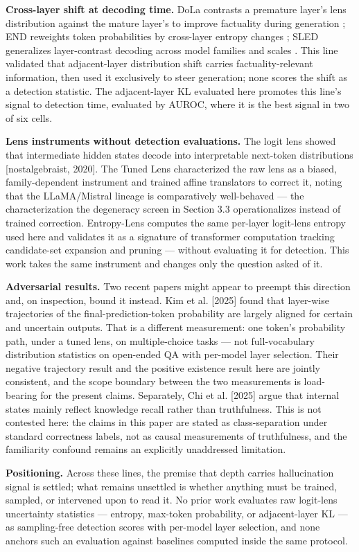 \textbf{Cross-layer shift at decoding time.} DoLa contrasts a premature layer's lens distribution against the mature layer's to improve factuality during generation \citep{Chuang2023}; END reweights token probabilities by cross-layer entropy changes \citep{Wu2025}; SLED generalizes layer-contrast decoding across model families and scales \citep{Zhang2024}. This line validated that adjacent-layer distribution shift carries factuality-relevant information, then used it exclusively to steer generation; none scores the shift as a detection statistic. The adjacent-layer KL evaluated here promotes this line's signal to detection time, evaluated by AUROC, where it is the best signal in two of six cells.

\textbf{Lens instruments without detection evaluations.} The logit lens showed that intermediate hidden states decode into interpretable next-token distributions [nostalgebraist, 2020]. The Tuned Lens characterized the raw lens as a biased, family-dependent instrument and trained affine translators to correct it, noting that the LLaMA/Mistral lineage is comparatively well-behaved \citep{Belrose2023} --- the characterization the degeneracy screen in Section 3.3 operationalizes instead of trained correction. Entropy-Lens computes the same per-layer logit-lens entropy used here and validates it as a signature of transformer computation tracking candidate-set expansion and pruning \citep{Ali2025} --- without evaluating it for detection. This work takes the same instrument and changes only the question asked of it.

\textbf{Adversarial results.} Two recent papers might appear to preempt this direction and, on inspection, bound it instead. Kim et al. [2025] found that layer-wise trajectories of the final-prediction-token probability are largely aligned for certain and uncertain outputs. That is a different measurement: one token's probability path, under a tuned lens, on multiple-choice tasks --- not full-vocabulary distribution statistics on open-ended QA with per-model layer selection. Their negative trajectory result and the positive existence result here are jointly consistent, and the scope boundary between the two measurements is load-bearing for the present claims. Separately, Chi et al. [2025] argue that internal states mainly reflect knowledge recall rather than truthfulness. This is not contested here: the claims in this paper are stated as class-separation under standard correctness labels, not as causal measurements of truthfulness, and the familiarity confound remains an explicitly unaddressed limitation.

\textbf{Positioning.} Across these lines, the premise that depth carries hallucination signal is settled; what remains unsettled is whether anything must be trained, sampled, or intervened upon to read it. No prior work evaluates raw logit-lens uncertainty statistics --- entropy, max-token probability, or adjacent-layer KL --- as sampling-free detection scores with per-model layer selection, and none anchors such an evaluation against baselines computed inside the same protocol.
